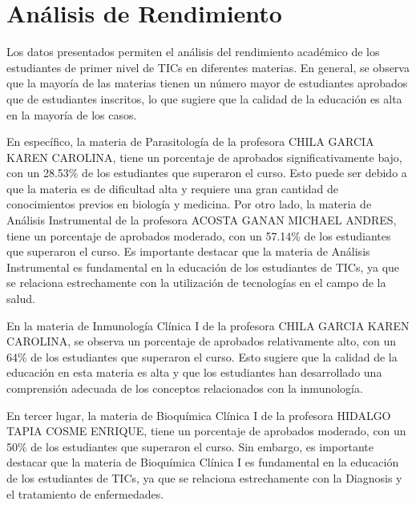 \vspace{1cm}
\section{Análisis de Rendimiento}
Los datos presentados permiten el análisis del rendimiento académico de los estudiantes de primer nivel de TICs en diferentes materias. En general, se observa que la mayoría de las materias tienen un número mayor de estudiantes aprobados que de estudiantes inscritos, lo que sugiere que la calidad de la educación es alta en la mayoría de los casos.

En específico, la materia de Parasitología de la profesora CHILA GARCIA KAREN CAROLINA, tiene un porcentaje de aprobados significativamente bajo, con un 28.53\% de los estudiantes que superaron el curso. Esto puede ser debido a que la materia es de dificultad alta y requiere una gran cantidad de conocimientos previos en biología y medicina. Por otro lado, la materia de Análisis Instrumental de la profesora ACOSTA GANAN MICHAEL ANDRES, tiene un porcentaje de aprobados moderado, con un 57.14\% de los estudiantes que superaron el curso. Es importante destacar que la materia de Análisis Instrumental es fundamental en la educación de los estudiantes de TICs, ya que se relaciona estrechamente con la utilización de tecnologías en el campo de la salud.

En la materia de Inmunología Clínica I de la profesora CHILA GARCIA KAREN CAROLINA, se observa un porcentaje de aprobados relativamente alto, con un 64\% de los estudiantes que superaron el curso. Esto sugiere que la calidad de la educación en esta materia es alta y que los estudiantes han desarrollado una comprensión adecuada de los conceptos relacionados con la inmunología.

En tercer lugar, la materia de Bioquímica Clínica I de la profesora HIDALGO TAPIA COSME ENRIQUE, tiene un porcentaje de aprobados moderado, con un 50\% de los estudiantes que superaron el curso. Sin embargo, es importante destacar que la materia de Bioquímica Clínica I es fundamental en la educación de los estudiantes de TICs, ya que se relaciona estrechamente con la Diagnosis y el tratamiento de enfermedades.

